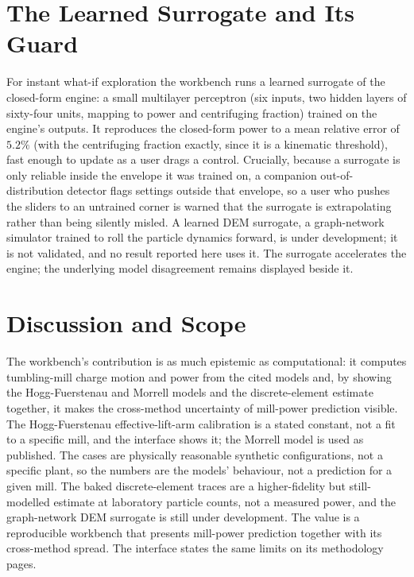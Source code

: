 \documentclass[journal]{IEEEtran}
\begin{document}
\section{The Learned Surrogate and Its Guard}\label{sec:surrogate}

For instant what-if exploration the workbench runs a learned surrogate of the closed-form engine: a small
multilayer perceptron (six inputs, two hidden layers of sixty-four units, mapping to power and centrifuging
fraction) trained on the engine's outputs. It reproduces the closed-form power to a mean relative error of
$5.2\%$ (with the centrifuging fraction exactly, since it is a kinematic threshold), fast enough to update as a
user drags a control. Crucially, because a surrogate is only reliable inside the envelope it was trained on, a
companion out-of-distribution detector flags settings outside that envelope, so a user who pushes the sliders to
an untrained corner is warned that the surrogate is extrapolating rather than being silently misled. A learned
DEM surrogate, a graph-network simulator trained to roll the particle dynamics forward, is under development; it
is not validated, and no result reported here uses it. The surrogate accelerates the engine; the underlying model
disagreement remains displayed beside it.

\section{Discussion and Scope}\label{sec:discuss}

The workbench's contribution is as much epistemic as computational: it computes tumbling-mill charge motion and
power from the cited models and, by showing the Hogg-Fuerstenau and Morrell models and the discrete-element
estimate together, it makes the cross-method uncertainty of mill-power prediction visible. The
Hogg-Fuerstenau effective-lift-arm calibration is a stated constant, not a fit to a specific mill, and the
interface shows it; the Morrell model is used as published. The cases are physically reasonable
synthetic configurations, not a specific plant, so the numbers are the models' behaviour, not a prediction for a
given mill. The baked discrete-element traces are a higher-fidelity but still-modelled estimate at laboratory
particle counts, not a measured power, and the graph-network DEM surrogate is still under development. The value
is a reproducible workbench that presents mill-power prediction together with its cross-method spread. The
interface states the same limits on its methodology pages.
\end{document}
